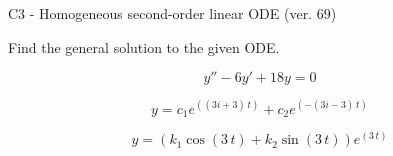 \begin{exercise}
  \begin{exerciseTitle}C3 - Homogeneous second-order linear ODE (ver. 69)\end{exerciseTitle}
  \begin{exerciseStatement}
    
Find the general solution to the given ODE.

    
\[y''-6y'+18y = 0\]

  \end{exerciseStatement}
  \begin{exerciseAnswer}
    
\[y= c_{1} e^{\left(\left(3 i + 3\right) \, t\right)} + c_{2} e^{\left(-\left(3 i - 3\right) \, t\right)}\]

    
\[y= {\left(k_{1} \cos\left(3 \, t\right) + k_{2} \sin\left(3 \, t\right)\right)} e^{\left(3 \, t\right)}\]

  \end{exerciseAnswer}
\end{exercise}